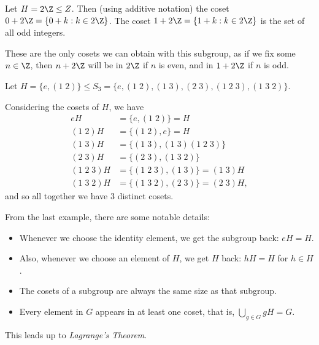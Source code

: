 \begin{example}[Cosets of $2\Z$]
Let $H = 2\Z \leq Z$. Then (using additive notation) the coset $0 + 2\Z = \{0 + k : k \in 2\Z\}$. The coset $1 + 2\Z = \{1 + k : k \in 2\Z\}$ is the set of all odd integers.  

These are the only cosets we can obtain with this subgroup, as if we fix some $n \in \Z$, then $n + 2\Z$ will be in $2\Z$ if $n$ is even, and in $1 + 2\Z$ if $n$ is odd.
\end{example}

\begin{example}
	Let $H = \{ e, (1\; 2) \} \leq S_3 = \{e, (1\; 2), (1\; 3), (2\; 3), (1\; 2\; 3), (1\; 3\; 2)\}$.

	Considering the cosets of $H$, we have 
	\begin{align*}
		eH &= \{ e, (1\; 2) \} = H \\
		(1\; 2) H &= \{(1\; 2), e\} = H \\
		(1\; 3) H &= \{ (1\; 3), (1\; 3)(1\; 2\; 3)\} \\
		(2\; 3) H &= \{(2\; 3), (1\; 3\; 2)\}\\
		(1\; 2\; 3) H &= \{ (1\; 2\; 3), (1\; 3)\} = (1\; 3)H\\
		(1\; 3\; 2) H &= \{(1\; 3\; 2), (2\; 3)\} = (2\; 3)H,
	\end{align*}
	and so all together we have 3 distinct cosets.
\end{example}

From the last example, there are some notable details:
\begin{itemize}
	\item Whenever we choose the identity element, we get the subgroup back: $eH = H$.
	\item Also, whenever we choose an element of $H$, we get $H$ back: $h H= H$ for $h \in H$.
	\item The cosets of a subgroup are always the same size as that subgroup.
	\item Every element in $G$ appears in at least one coset, that is, $\displaystyle \bigcup_{g \in G} gH = G$.
\end{itemize}

This leads up to \emph{Lagrange's Theorem}.

